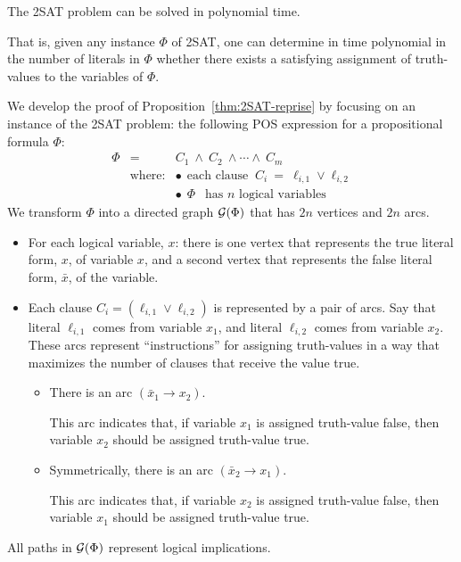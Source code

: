 \begin{prop}
\label{thm:2SAT-reprise}
The {\sf 2SAT} problem can be solved in polynomial time.

\smallskip

\noindent
That is, given any instance $\Phi$ of {\sf 2SAT}, one can determine in
time polynomial in the number of literals in $\Phi$ whether there
exists a satisfying assignment of truth-values to the variables of
$\Phi$.
\end{prop}

We develop the proof of Proposition~\ref{thm:2SAT-reprise} by focusing on an instance of the {\sf 2SAT} problem: the following POS expression for a propositional formula $\Phi$:
\begin{eqnarray}
\label{eq:Phi-2SAT}
\Phi & = & C_1 \ \wedge \ C_2 \ \wedge \cdots \wedge \ C_m \\
\nonumber
  & \mbox{where:} & \bullet \ \ \mbox{each clause }
 \ C_i \ = \ \ell_{i,1} \vee \ell_{i,2} \\
\nonumber
  &               & \bullet \ \ \Phi \ \ \mbox{ has $n$ logical variables}
\end{eqnarray}
We transform $\Phi$ into a directed graph $\mbox{$\cal G$}(\Phi)$ that has $2n$ vertices and $2n$ arcs.
\begin{itemize}
\item
For each logical variable, $x$: there is one vertex that represents the {\sc true} literal form, $x$, of variable $x$, and a second vertex that represents the {\sc false} literal form, $\bar{x}$, of the
variable.
\item
Each clause $C_i = (\ell_{i,1} \vee \ell_{i,2})$ is represented by a pair of arcs.  Say that literal $\ell_{i,1}$ comes from variable $x_1$, and literal $\ell_{i,2}$ comes from variable $x_2$.  These arcs represent ``instructions'' for assigning truth-values in a way that maximizes the number of clauses that receive the value {\sc true}.
  \begin{itemize}
  \item
There is an arc $(\bar{x}_1 \rightarrow x_2)$.

\smallskip

This arc indicates that, if variable $x_1$ is assigned truth-value {\sc false}, then variable $x_2$ should be assigned truth-value {\sc true}.
  \item
Symmetrically, there is an arc $(\bar{x}_2 \rightarrow x_1)$.

This arc indicates that, if variable $x_2$ is assigned truth-value {\sc false}, then variable $x_1$ should be assigned truth-value {\sc true}.
  \end{itemize}
\end{itemize}
All paths in $\mbox{$\cal G$}(\Phi)$ represent logical implications. 

